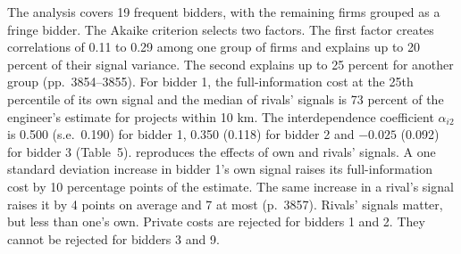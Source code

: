  The analysis covers 19 frequent bidders, with the remaining firms grouped as a fringe
bidder. The Akaike criterion selects two factors. The first factor creates correlations of 0.11 to 0.29 among one
group of firms and explains up to 20 percent of their signal variance. The second explains up to 25 percent for
another group (pp.~3854--3855). For bidder 1, the full-information cost at the 25th percentile of its own signal
and the median of rivals' signals is 73 percent of the engineer's estimate for projects within 10 km. The
interdependence coefficient $\alpha_{i2}$ is 0.500 (s.e.\ 0.190) for bidder 1, 0.350 (0.118) for bidder 2 and
$-0.025$ (0.092) for bidder 3 (Table~5).  reproduces the effects of own and rivals'
signals. A one standard deviation increase in bidder 1's own signal raises its full-information cost by 10
percentage points of the estimate. The same increase in a rival's signal raises it by 4 points on average and 7
at most (p.~3857). Rivals' signals matter, but less than one's own. Private costs are rejected for bidders 1 and
2. They cannot be rejected for bidders 3 and 9.

